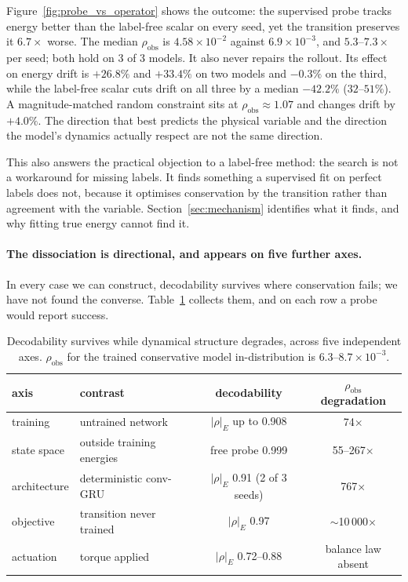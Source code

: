 Figure~\ref{fig:probe_vs_operator} shows the outcome: the supervised
probe tracks energy better than the label-free scalar on every seed, yet the transition preserves it
$6.7\times$ worse. The median $\rho_{\mathrm{obs}}$ is $4.58\times10^{-2}$ against
$6.9\times10^{-3}$, and $5.3$--$7.3\times$ per seed; both hold on 3 of 3 models. It also never repairs the
rollout. Its effect on energy drift is $+26.8\%$ and $+33.4\%$ on two models and $-0.3\%$ on the third,
while the label-free scalar cuts drift on all three by a median $-42.2\%$ ($32$--$51\%$). A
magnitude-matched random constraint sits at $\rho_{\mathrm{obs}} \approx 1.07$ and changes drift by
$+4.0\%$. The direction that best
predicts the physical variable and the direction the model's dynamics actually respect are not the
same direction.

This also answers the practical objection to a label-free method: the search is not a workaround for
missing labels. It finds something a supervised fit on perfect labels does not, because it optimises
conservation by the transition rather than agreement with the variable.
Section~\ref{sec:mechanism} identifies what it finds, and why fitting true energy cannot find it.

\paragraph{The dissociation is directional, and appears on five further axes.}
In every case we can construct, decodability survives where conservation fails; we have not found the
converse. Table~\ref{tab:axes} collects them, and on each row a probe would report success.

\begin{table}[t]
\centering\small
\caption{Decodability survives while dynamical structure degrades, across five independent axes.
$\rho_{\mathrm{obs}}$ for the trained conservative model in-distribution is $6.3$--$8.7\times10^{-3}$.}
\label{tab:axes}
\begin{tabular}{llcc}
\toprule
axis & contrast & decodability & $\rho_{\mathrm{obs}}$ degradation \\
\midrule
training & untrained network & $|\rho|_E$ up to 0.908 & 74$\times$ \\
state space & outside training energies & free probe 0.999 & 55--267$\times$ \\
architecture & deterministic conv-GRU & $|\rho|_E$ 0.91 (2 of 3 seeds) & 767$\times$ \\
objective & transition never trained & $|\rho|_E$ 0.97 & $\sim$10\,000$\times$ \\
actuation & torque applied & $|\rho|_E$ 0.72--0.88 & balance law absent \\
\bottomrule
\end{tabular}
\end{table}

